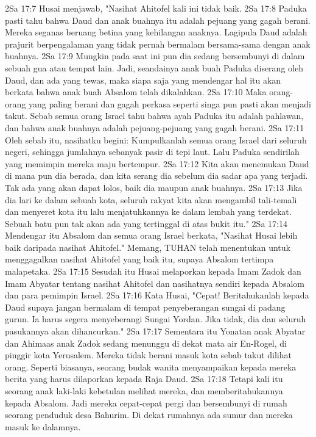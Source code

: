2Sa 17:7  Husai menjawab, "Nasihat Ahitofel kali ini tidak baik.
2Sa 17:8  Paduka pasti tahu bahwa Daud dan anak buahnya itu adalah pejuang yang gagah berani. Mereka seganas beruang betina yang kehilangan anaknya. Lagipula Daud adalah prajurit berpengalaman yang tidak pernah bermalam bersama-sama dengan anak buahnya.
2Sa 17:9  Mungkin pada saat ini pun dia sedang bersembunyi di dalam sebuah gua atau tempat lain. Jadi, seandainya anak buah Paduka diserang oleh Daud, dan ada yang tewas, maka siapa saja yang mendengar hal itu akan berkata bahwa anak buah Absalom telah dikalahkan.
2Sa 17:10  Maka orang-orang yang paling berani dan gagah perkasa seperti singa pun pasti akan menjadi takut. Sebab semua orang Israel tahu bahwa ayah Paduka itu adalah pahlawan, dan bahwa anak buahnya adalah pejuang-pejuang yang gagah berani.
2Sa 17:11  Oleh sebab itu, nasihatku begini: Kumpulkanlah semua orang Israel dari seluruh negeri, sehingga jumlahnya sebanyak pasir di tepi laut. Lalu Paduka sendirilah yang memimpin mereka maju bertempur.
2Sa 17:12  Kita akan menemukan Daud di mana pun dia berada, dan kita serang dia sebelum dia sadar apa yang terjadi. Tak ada yang akan dapat lolos, baik dia maupun anak buahnya.
2Sa 17:13  Jika dia lari ke dalam sebuah kota, seluruh rakyat kita akan mengambil tali-temali dan menyeret kota itu lalu menjatuhkannya ke dalam lembah yang terdekat. Sebuah batu pun tak akan ada yang tertinggal di atas bukit itu."
2Sa 17:14  Mendengar itu Absalom dan semua orang Israel berkata, "Nasihat Husai lebih baik daripada nasihat Ahitofel." Memang, TUHAN telah menentukan untuk menggagalkan nasihat Ahitofel yang baik itu, supaya Absalom tertimpa malapetaka.
2Sa 17:15  Sesudah itu Husai melaporkan kepada Imam Zadok dan Imam Abyatar tentang nasihat Ahitofel dan nasihatnya sendiri kepada Absalom dan para pemimpin Israel.
2Sa 17:16  Kata Husai, "Cepat! Beritahukanlah kepada Daud supaya jangan bermalam di tempat penyeberangan sungai di padang gurun. Ia harus segera menyeberangi Sungai Yordan. Jika tidak, dia dan seluruh pasukannya akan dihancurkan."
2Sa 17:17  Sementara itu Yonatan anak Abyatar dan Ahimaas anak Zadok sedang menunggu di dekat mata air En-Rogel, di pinggir kota Yerusalem. Mereka tidak berani masuk kota sebab takut dilihat orang. Seperti biasanya, seorang budak wanita menyampaikan kepada mereka berita yang harus dilaporkan kepada Raja Daud.
2Sa 17:18  Tetapi kali itu seorang anak laki-laki kebetulan melihat mereka, dan memberitahukannya kepada Absalom. Jadi mereka cepat-cepat pergi dan bersembunyi di rumah seorang penduduk desa Bahurim. Di dekat rumahnya ada sumur dan mereka masuk ke dalamnya.
